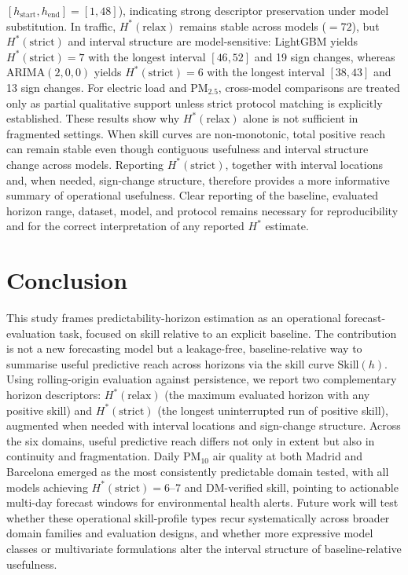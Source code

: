 \documentclass[pdflatex,sn-mathphys]{sn-jnl}
\begin{document}
$[h_{\mathrm{start}}, h_{\mathrm{end}}]=[1,48]$), indicating strong
descriptor preservation under model substitution. In traffic,
$H^*(\mathrm{relax})$ remains stable across models ($=72$), but
$H^*(\mathrm{strict})$ and interval structure are model-sensitive:
LightGBM yields $H^*(\mathrm{strict})=7$ with the longest interval $[46,52]$
and 19 sign changes, whereas ARIMA$(2,0,0)$ yields
$H^*(\mathrm{strict})=6$ with the longest interval $[38,43]$ and 13 sign
changes. For electric load and PM$_{2.5}$, cross-model comparisons are
treated only as partial qualitative support unless strict protocol
matching is explicitly established.
These results show why $H^*(\mathrm{relax})$ alone is not sufficient in
fragmented settings. When skill curves are non-monotonic, total positive
reach can remain stable even though contiguous usefulness and interval
structure change across models. Reporting $H^*(\mathrm{strict})$,
together with interval locations and, when needed, sign-change
structure, therefore provides a more informative summary of operational
usefulness. Clear reporting of the baseline, evaluated horizon range,
dataset, model, and protocol remains necessary for reproducibility and
for the correct interpretation of any reported $H^*$ estimate.

\section{Conclusion}
This study frames predictability-horizon estimation as an operational
forecast-evaluation task, focused on skill relative to an explicit
baseline. The contribution is not a new forecasting model but a
leakage-free, baseline-relative way to summarise useful predictive reach
across horizons via the skill curve $\mathrm{Skill}(h)$.
Using rolling-origin evaluation against persistence, we report two
complementary horizon descriptors: $H^*(\mathrm{relax})$ (the maximum
evaluated horizon with any positive skill) and $H^*(\mathrm{strict})$
(the longest uninterrupted run of positive skill), augmented when needed
with interval locations and sign-change structure. Across the six
domains, useful predictive reach differs not only in extent but also in
continuity and fragmentation. Daily PM$_{10}$ air quality at both Madrid
and Barcelona emerged as the most consistently predictable domain tested,
with all models achieving $H^*(\mathrm{strict})=6$--7 and DM-verified
skill, pointing to actionable multi-day forecast windows for
environmental health alerts. Future work will test whether these
operational skill-profile types recur systematically across broader
domain families and evaluation designs, and whether more expressive model
classes or multivariate formulations alter the interval structure of
baseline-relative usefulness.
\end{document}
